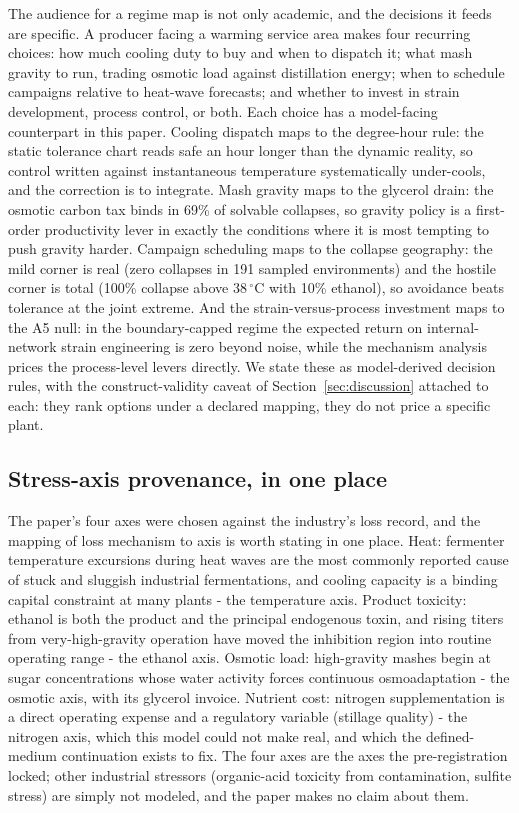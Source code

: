 \documentclass[12pt]{article}
\begin{document}
The audience for a regime map is not only academic, and the decisions
it feeds are specific. A producer facing a warming service area makes
four recurring choices: how much cooling duty to buy and when to
dispatch it; what mash gravity to run, trading osmotic load against
distillation energy; when to schedule campaigns relative to heat-wave
forecasts; and whether to invest in strain development, process
control, or both. Each choice has a model-facing counterpart in this
paper. Cooling dispatch maps to the degree-hour rule: the static
tolerance chart reads safe an hour longer than the dynamic reality,
so control written against instantaneous temperature systematically
under-cools, and the correction is to integrate. Mash gravity maps to
the glycerol drain: the osmotic carbon tax binds in 69\% of solvable
collapses, so gravity policy is a first-order productivity lever in
exactly the conditions where it is most tempting to push gravity
harder. Campaign scheduling maps to the collapse geography: the mild
corner is real (zero collapses in 191 sampled environments) and the
hostile corner is total (100\% collapse above 38\,$^{\circ}$C with
10\% ethanol), so avoidance beats tolerance at the joint extreme.
And the strain-versus-process investment maps to the A5 null: in the
boundary-capped regime the expected return on internal-network strain
engineering is zero beyond noise, while the mechanism analysis prices
the process-level levers directly. We state these as model-derived
decision rules, with the construct-validity caveat of
Section~\ref{sec:discussion} attached to each: they rank options
under a declared mapping, they do not price a specific plant.

\subsection{Stress-axis provenance, in one place}

The paper's four axes were chosen against the industry's loss record,
and the mapping of loss mechanism to axis is worth stating in one
place. Heat: fermenter temperature excursions during heat waves are
the most commonly reported cause of stuck and sluggish industrial
fermentations, and cooling capacity is a binding capital constraint
at many plants - the temperature axis. Product toxicity: ethanol is
both the product and the principal endogenous toxin, and rising
titers from very-high-gravity operation have moved the inhibition
region into routine operating range - the ethanol axis. Osmotic
load: high-gravity mashes begin at sugar concentrations whose water
activity forces continuous osmoadaptation - the osmotic axis, with
its glycerol invoice. Nutrient cost: nitrogen supplementation is a
direct operating expense and a regulatory variable (stillage quality)
- the nitrogen axis, which this model could not make real, and which
the defined-medium continuation exists to fix. The four axes are the
axes the pre-registration locked; other industrial stressors
(organic-acid toxicity from contamination, sulfite stress) are simply
not modeled, and the paper makes no claim about them.
\end{document}
